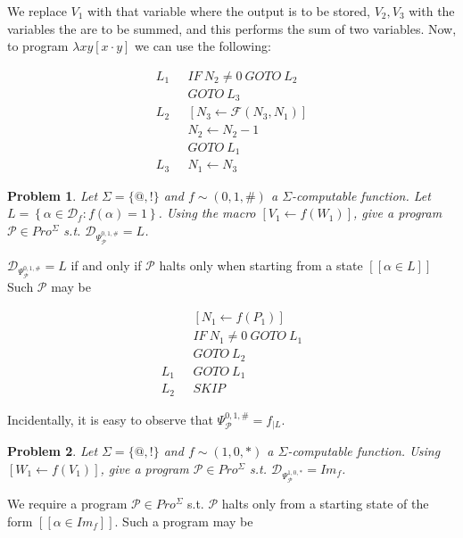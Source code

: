 \documentclass[a4paper, 12pt]{article}
\newtheorem{problem}{Problem}
\newtheorem{problem}{Problem}
\begin{document}
We replace $V_1$ with that variable where the output is to be stored, $V_2, V_3$
with the variables the are to be summed, and this performs the sum of two
variables. Now, to program $\lambda xy[x \cdot y]$ we can use the following:

\begin{align*}
    L_1 ~ ~ ~ & IF ~ N_2 \neq 0 ~ GOTO ~ L_2 \\ 
              & GOTO ~ L_3 \\ 
    L_2 ~ ~ ~ & \left[ N_3 \leftarrow \mathcal{F}(N_3, N_1) \right]  \\ 
              &N_2 \leftarrow  N_2 - 1 \\ 
              &GOTO ~ L_1 \\ 
    L_3 ~ ~ ~ &N_1 \leftarrow N_3
\end{align*}

\begin{problem}
    Let $\Sigma = \{@, !\}$ and $f \sim (0, 1, \#)$ a $\Sigma$-computable
    function. Let $L = \left\{ \alpha \in \mathcal{D}_f : f(\alpha) = 1 \right\}
    $. Using the macro $\left[ V_1 \leftarrow f(W_1) \right] $, give a program
    $\mathcal{P} \in Pro^{\Sigma}$ s.t. $\mathcal{D}_{\Psi_{\mathcal{P}}^{0, 1,
    \#}} = L$.
\end{problem}

$\mathcal{D}_{\Psi_{\mathcal{P}}^{0, 1, \#}} = L$ if and only if $\mathcal{P}$
halts only when starting from a state $[\![ \alpha \in L ]\!]$
Such $\mathcal{P}$ may be 

\begin{align*}
    &[N_1 \leftarrow f(P_1)]\\
    &IF ~ N_1 \neq 0 ~ GOTO  ~ L_1 \\ 
    &GOTO ~ L_2 \\ 
    L_1  ~ ~ ~ & GOTO ~ L_1 \\ 
    L_2 ~ ~ ~ & SKIP
\end{align*}

Incidentally, it is easy to observe that $\Psi_{\mathcal{P}}^{0, 1, \#} = f_{\mid L}$.

\begin{problem}
    Let $\Sigma = \{@, !\}$ and $f \sim (1, 0, *)$ a $\Sigma$-computable
    function. Using $\left[ W_1 \leftarrow f(V_1) \right] $, give a program
    $\mathcal{P} \in Pro^{\Sigma}$ s.t. $\mathcal{D}_{\Psi_{\mathcal{P}}^{1, 0,
    *}} = Im_{f}$.
\end{problem}

We require a program $\mathcal{P} \in Pro^{\Sigma}$ s.t. $\mathcal{P}$ halts
only from a starting state of the form $[\![ \alpha \in Im_f ]\!]$. Such a program
may be 
\end{document}
